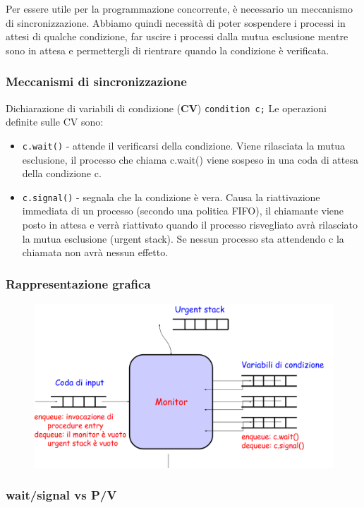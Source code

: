 Per essere utile per la programmazione concorrente, è necessario un meccanismo di sincronizzazione.
Abbiamo quindi necessità di poter sospendere i processi in attesi di qualche condizione, far uscire i processi dalla mutua esclusione mentre sono in attesa e permettergli di rientrare quando la condizione è verificata.

\subsubsection{Meccanismi di sincronizzazione}
Dichiarazione di variabili di condizione (\textbf{CV})
\lstinline{condition c;}
Le operazioni definite sulle CV sono:
\begin{itemize}
    \item \lstinline{c.wait()} - attende il verificarsi della condizione. Viene rilasciata la mutua esclusione, il processo che chiama c.wait() viene sospeso in una coda di
attesa della condizione c.
    \item \lstinline{c.signal()} - segnala che la condizione è vera. Causa la riattivazione immediata di un processo
(secondo una politica FIFO), il chiamante viene posto in attesa e verrà riattivato quando il processo risvegliato avrà rilasciato la mutua esclusione (urgent stack). Se nessun processo sta attendendo c la chiamata non avrà nessun effetto.
\end{itemize}
\newpage
\subsubsection{Rappresentazione grafica} 
\begin{figure} [h]
    \centering
    \includegraphics[width=0.7\linewidth]{Images/Screenshot 2025-01-16 at 12-18-56 so-03.1-concorrenza - so-03.1-concorrenza.pdf.png}
\end{figure}

\subsubsection{ wait/signal vs P/V}


